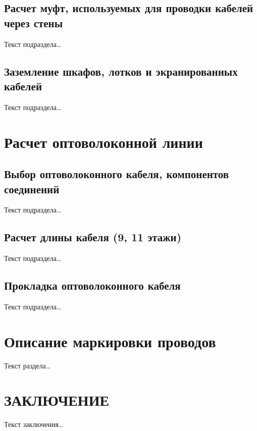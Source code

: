 \documentclass[a4paper,oneside,14pt]{extreport}
\begin{document}
\section{Расчет муфт, используемых для проводки кабелей через стены}
Текст подраздела\ldots

\section{Заземление шкафов, лотков и экранированных кабелей}
Текст подраздела\ldots


\chapter{Расчет оптоволоконной линии}

\section{Выбор оптоволоконного кабеля, компонентов соединений}
Текст подраздела\ldots

\section{Расчет длины кабеля (9, 11 этажи)}
Текст подраздела\ldots

\section{Прокладка оптоволоконного кабеля}
Текст подраздела\ldots


\chapter{Описание маркировки проводов}
Текст раздела\ldots


\chapter*{ЗАКЛЮЧЕНИЕ}

Текст заключения\ldots

\end{document}
